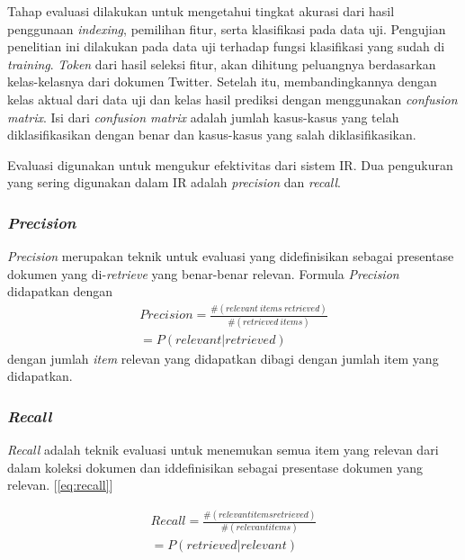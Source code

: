 Tahap evaluasi dilakukan untuk mengetahui tingkat akurasi dari hasil penggunaan \textit{indexing}, pemilihan fitur, serta klasifikasi pada data uji. Pengujian penelitian ini dilakukan pada data uji terhadap fungsi klasifikasi yang sudah di \textit{training}. \textit{Token} dari hasil seleksi fitur, akan dihitung peluangnya berdasarkan kelas-kelasnya dari dokumen Twitter. Setelah itu, membandingkannya dengan kelas aktual dari data uji dan kelas hasil prediksi dengan menggunakan \textit{confusion matrix}. Isi dari \textit{confusion matrix} adalah jumlah kasus-kasus yang telah diklasifikasikan dengan benar dan kasus-kasus yang salah diklasifikasikan.

Evaluasi digunakan untuk mengukur efektivitas dari sistem IR. Dua pengukuran yang sering digunakan dalam IR adalah \textit{precision} dan \textit{recall}.

\subsubsection*{\textit{Precision}}
\textit{Precision} merupakan teknik untuk evaluasi yang didefinisikan sebagai presentase dokumen yang di-\textit{retrieve} yang benar-benar relevan. Formula \textit{Precision} didapatkan dengan
\begin{equation}
\begin{split}
Precision = \frac{\#(relevant\: items\: retrieved)}{\#(retrieved\:  items)} \\ 
= P(relevant|retrieved)
\label{eq:precision}
\end{split}
\end{equation}
dengan jumlah \textit{item} relevan yang didapatkan dibagi dengan jumlah item yang didapatkan.

\subsubsection*{\textit{Recall}}
\textit{Recall} adalah teknik evaluasi untuk menemukan semua item yang relevan dari dalam koleksi dokumen dan iddefinisikan sebagai presentase dokumen yang relevan. [\ref{eq:recall}]

\begin{equation}
\begin{split}
Recall = \frac{\#(relevant items retrieved)}{\#(relevant items)} \\ 
= P(retrieved|relevant)
\label{eq:recall}
\end{split}
\end{equation}

